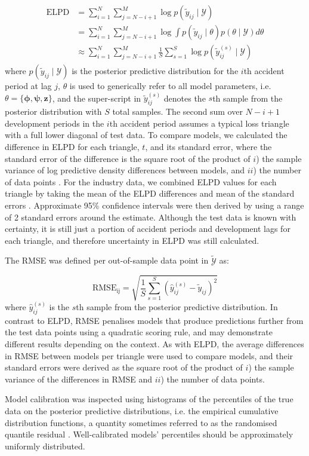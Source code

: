 \begin{align}
	\label{eq:elpd}
	\begin{split}
	\mathrm{ELPD} &= \sum_{i=1}^{N} \sum_{j=N - i + 1}^{M} 
					\log p(\tilde{y}_{ij} \mid \mathcal{Y})\\
				 &=	\sum_{i=1}^{N} \sum_{j=N - i + 1}^{M} 
					\log \int p(\tilde{y}_{ij} \mid \theta)
					p(\theta \mid \mathcal{Y})
					d \theta \\
				 &\approx \sum_{i=1}^{N} \sum_{j=N - i + 1}^{M} 
					\frac{1}{S} \sum_{s=1}^{S} 
					\log p(\tilde{y}_{ij}^{(s)} \mid \mathcal{Y})
	\end{split}
\end{align}
%
where $p(\tilde{y}_{ij} \mid \mathcal{Y})$
is the posterior predictive distribution for
the $i$th accident period at lag $j$,
$\theta$ is used to generically refer to all
model parameters, i.e. $\theta = \{\bm{\phi}, \bm{\psi}, \bm{z}\}$,
and the super-script in $\tilde{y}_{ij}^{(s)}$ denotes the
$s$th sample from the posterior distribution with $S$
total samples.
The second sum over $N - i + 1$ development periods in the
$i$th accident period assumes a typical loss triangle
with a full lower diagonal of test data.
To compare models, we
calculated the difference in ELPD for each triangle, $t$,
and its standard error,
where the standard error of the difference is the
square root of the product of $i$) the sample variance of log predictive
density differences between models, and $ii$) 
the number of data points \citep{vehtari2017,sivula2020}.
For the industry data, we combined ELPD values for each
triangle by taking the mean of the ELPD differences and 
mean of the standard errors \citep{sivula2020}. 
Approximate 95\% confidence intervals were then derived
by using a range of 2 standard errors around the estimate.
Although the test data is known with certainty,
it is still just a portion of accident periods
and development lags
for each triangle, and therefore uncertainty
in ELPD was still calculated.

The RMSE was defined per out-of-sample data point in
$\tilde{\mathcal{Y}}$ as:

\begin{equation}
	\label{eq:rmse}
	\mathrm{RMSE_{ij}} = \sqrt{\frac{1}{S} \sum_{s=1}^{S} (\hat{y}_{ij}^{(s)} - \tilde{y}_{ij})^2}
\end{equation}
%
where $\hat{y}_{ij}^{(s)}$ is the $s$th sample from the 
posterior predictive distribution.
In contrast to ELPD, RMSE penalises models that produce
predictions further from the test data points using a
quadratic scoring rule,
and may demonstrate different results depending
on the context.
As with ELPD, the average differences in RMSE
between models per triangle were used to compare models, and 
their standard errors were derived as the square root
of the product of $i$) the sample variance of the differences
in RMSE and $ii$) the number of data points.

Model calibration was inspected using histograms
of the percentiles of the true data on the 
posterior predictive distributions, i.e.
the empirical cumulative distribution functions, 
a quantity sometimes referred to as the
randomised quantile residual \citep{dunn1996}.
Well-calibrated models' percentiles should be
approximately uniformly distributed.


